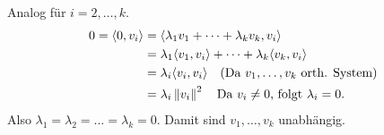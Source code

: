 Analog für $i=2,\dots,k$.
\begin{align*}
	0 = \langle 0, v_i\rangle &= \langle \lambda_1v_1 + \dots + \lambda_kv_k, v_i\rangle \\
	&= \lambda_1 \langle v_1, v_i\rangle + \dots + \lambda_k \langle v_k, v_i\rangle \\
	&= \lambda_i \langle v_i, v_i\rangle\quad\text{(Da $v_1,\dots,v_k$ orth. System)} \\
	&= \lambda_i \left\lVert v_i\right\rVert^2\quad\text{Da }v_i\neq 0\text{, folgt }\lambda_i = 0\text{.}
\end{align*}
Also $\lambda_1 = \lambda_2 = \dots = \lambda_k = 0$. Damit sind $v_1,\dots,v_k$ unabhängig.
